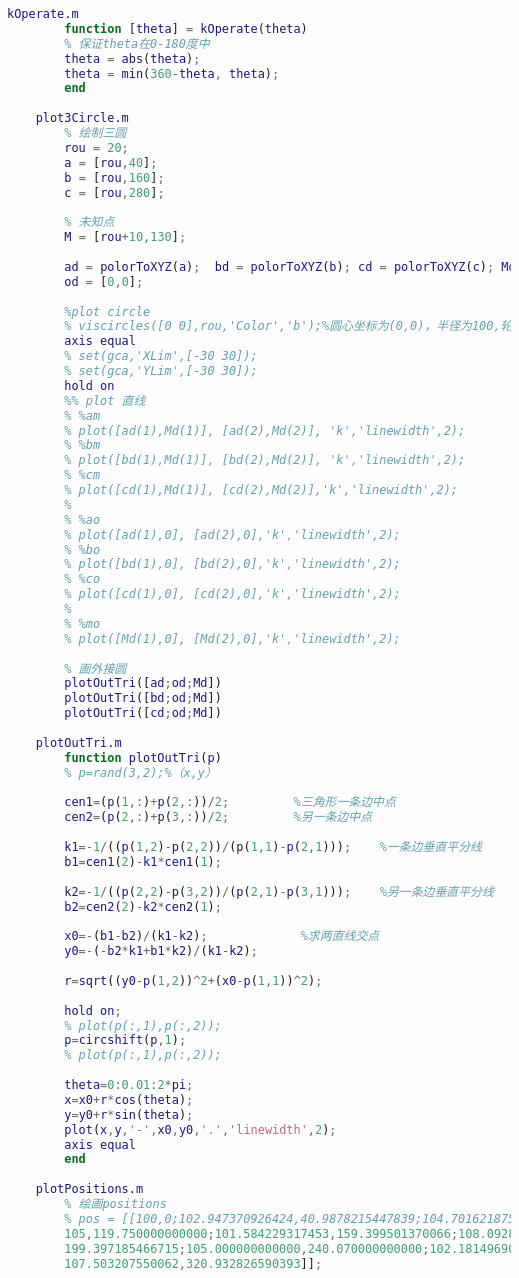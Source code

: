 \documentclass{cumcmthesis}
\begin{document}
\begin{appendices}
	\begin{lstlisting}[language=matlab]
	kOperate.m
		function [theta] = kOperate(theta)
		% 保证theta在0-180度中
		theta = abs(theta);
		theta = min(360-theta, theta);
		end
		
	plot3Circle.m
		% 绘制三圆
		rou = 20;
		a = [rou,40];
		b = [rou,160];
		c = [rou,280];
		
		% 未知点
		M = [rou+10,130];
		
		ad = polorToXYZ(a);  bd = polorToXYZ(b); cd = polorToXYZ(c); Md = polorToXYZ(M);
		od = [0,0];
		
		%plot circle
		% viscircles([0 0],rou,'Color','b');%圆心坐标为(0,0)，半径为100,轮廓颜色为蓝色
		axis equal
		% set(gca,'XLim',[-30 30]);
		% set(gca,'YLim',[-30 30]);
		hold on
		%% plot 直线
		% %am
		% plot([ad(1),Md(1)], [ad(2),Md(2)], 'k','linewidth',2);
		% %bm
		% plot([bd(1),Md(1)], [bd(2),Md(2)], 'k','linewidth',2);
		% %cm
		% plot([cd(1),Md(1)], [cd(2),Md(2)],'k','linewidth',2);
		% 
		% %ao
		% plot([ad(1),0], [ad(2),0],'k','linewidth',2);
		% %bo
		% plot([bd(1),0], [bd(2),0],'k','linewidth',2);
		% %co
		% plot([cd(1),0], [cd(2),0],'k','linewidth',2);
		% 
		% %mo
		% plot([Md(1),0], [Md(2),0],'k','linewidth',2);
		
		% 画外接圆
		plotOutTri([ad;od;Md])
		plotOutTri([bd;od;Md])
		plotOutTri([cd;od;Md])
		
	plotOutTri.m
		function plotOutTri(p)
		% p=rand(3,2);%（x,y）
		
		cen1=(p(1,:)+p(2,:))/2;         %三角形一条边中点
		cen2=(p(2,:)+p(3,:))/2;         %另一条边中点
		
		k1=-1/((p(1,2)-p(2,2))/(p(1,1)-p(2,1)));    %一条边垂直平分线
		b1=cen1(2)-k1*cen1(1);
		
		k2=-1/((p(2,2)-p(3,2))/(p(2,1)-p(3,1)));    %另一条边垂直平分线
		b2=cen2(2)-k2*cen2(1);
		
		x0=-(b1-b2)/(k1-k2);             %求两直线交点
		y0=-(-b2*k1+b1*k2)/(k1-k2);
		
		r=sqrt((y0-p(1,2))^2+(x0-p(1,1))^2); 
		
		hold on;
		% plot(p(:,1),p(:,2));
		p=circshift(p,1);
		% plot(p(:,1),p(:,2));
		
		theta=0:0.01:2*pi;
		x=x0+r*cos(theta);
		y=y0+r*sin(theta);
		plot(x,y,'-',x0,y0,'.','linewidth',2);
		axis equal
		end
		
	plotPositions.m
		% 绘画positions
		% pos = [[100,0;102.947370926424,40.9878215447839;104.701621875316,79.7685766852877;
		105,119.750000000000;101.584229317453,159.399501370066;108.092849067949,
		199.397185466715;105.000000000000,240.070000000000;102.181496909929,279.878588984783;
		107.503207550062,320.932826590393]];
		

\end{lstlisting}
\end{appendices}
\end{document}
